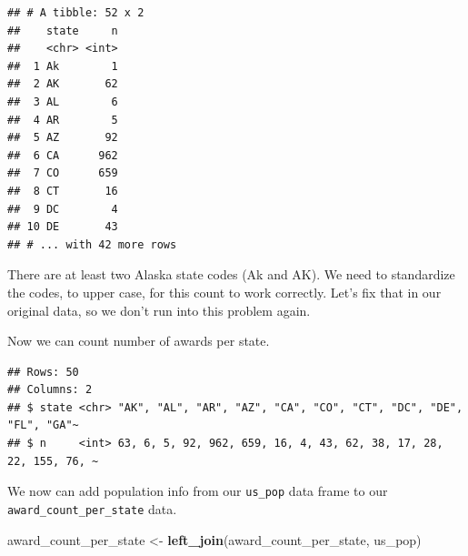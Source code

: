 \documentclass[
]{book}
\newenvironment{Shaded}{\begin{snugshade}}{\end{snugshade}}
\newcommand{\CommentTok}[1]{\textcolor[rgb]{0.56,0.35,0.01}{\textit{#1}}}
\newcommand{\DataTypeTok}[1]{\textcolor[rgb]{0.13,0.29,0.53}{#1}}
\newcommand{\KeywordTok}[1]{\textcolor[rgb]{0.13,0.29,0.53}{\textbf{#1}}}
\newcommand{\NormalTok}[1]{#1}
\newcommand{\OperatorTok}[1]{\textcolor[rgb]{0.81,0.36,0.00}{\textbf{#1}}}
\newcommand{\StringTok}[1]{\textcolor[rgb]{0.31,0.60,0.02}{#1}}
\begin{document}
\begin{verbatim}
## # A tibble: 52 x 2
##    state     n
##    <chr> <int>
##  1 Ak        1
##  2 AK       62
##  3 AL        6
##  4 AR        5
##  5 AZ       92
##  6 CA      962
##  7 CO      659
##  8 CT       16
##  9 DC        4
## 10 DE       43
## # ... with 42 more rows
\end{verbatim}

There are at least two Alaska state codes (Ak and AK). We need to standardize the codes, to upper case, for this count to work correctly. Let's fix that in our original data, so we don't run into this problem again.

\begin{Shaded}
\end{Shaded}

Now we can count number of awards per state.

\begin{Shaded}
\end{Shaded}

\begin{verbatim}
## Rows: 50
## Columns: 2
## $ state <chr> "AK", "AL", "AR", "AZ", "CA", "CO", "CT", "DC", "DE", "FL", "GA"~
## $ n     <int> 63, 6, 5, 92, 962, 659, 16, 4, 43, 62, 38, 17, 28, 22, 155, 76, ~
\end{verbatim}

We now can add population info from our \texttt{us\_pop} data frame to our \texttt{award\_count\_per\_state} data.

\begin{Shaded}
\begin{Highlighting}[]
\NormalTok{award_count_per_state <-}\StringTok{ }\KeywordTok{left_join}\NormalTok{(award_count_per_state, us_pop)}
\end{Highlighting}
\end{Shaded}
\end{document}
